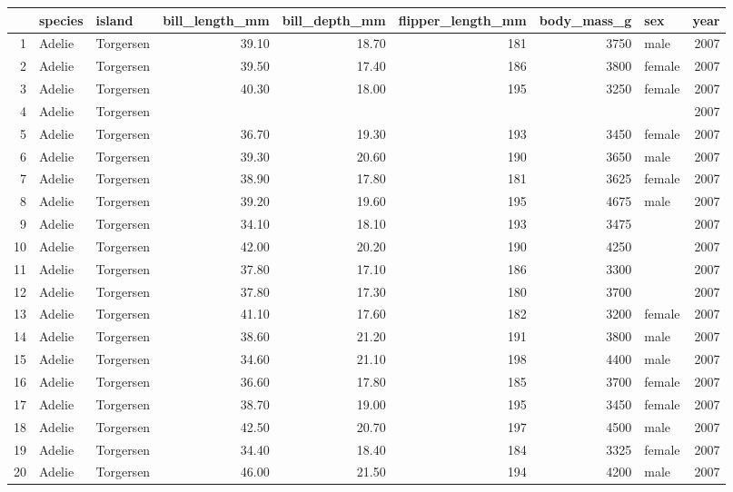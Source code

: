 \documentclass{article}\usepackage[]{graphicx}\usepackage[]{xcolor}
\begin{document}
\begin{table}[ht]
\centering
\begin{tabular}{rllrrrrlr}
  \hline
 & species & island & bill\_length\_mm & bill\_depth\_mm & flipper\_length\_mm & body\_mass\_g & sex & year \\ 
  \hline
1 & Adelie & Torgersen & 39.10 & 18.70 & 181 & 3750 & male & 2007 \\ 
  2 & Adelie & Torgersen & 39.50 & 17.40 & 186 & 3800 & female & 2007 \\ 
  3 & Adelie & Torgersen & 40.30 & 18.00 & 195 & 3250 & female & 2007 \\ 
  4 & Adelie & Torgersen &  &  &  &  &  & 2007 \\ 
  5 & Adelie & Torgersen & 36.70 & 19.30 & 193 & 3450 & female & 2007 \\ 
  6 & Adelie & Torgersen & 39.30 & 20.60 & 190 & 3650 & male & 2007 \\ 
  7 & Adelie & Torgersen & 38.90 & 17.80 & 181 & 3625 & female & 2007 \\ 
  8 & Adelie & Torgersen & 39.20 & 19.60 & 195 & 4675 & male & 2007 \\ 
  9 & Adelie & Torgersen & 34.10 & 18.10 & 193 & 3475 &  & 2007 \\ 
  10 & Adelie & Torgersen & 42.00 & 20.20 & 190 & 4250 &  & 2007 \\ 
  11 & Adelie & Torgersen & 37.80 & 17.10 & 186 & 3300 &  & 2007 \\ 
  12 & Adelie & Torgersen & 37.80 & 17.30 & 180 & 3700 &  & 2007 \\ 
  13 & Adelie & Torgersen & 41.10 & 17.60 & 182 & 3200 & female & 2007 \\ 
  14 & Adelie & Torgersen & 38.60 & 21.20 & 191 & 3800 & male & 2007 \\ 
  15 & Adelie & Torgersen & 34.60 & 21.10 & 198 & 4400 & male & 2007 \\ 
  16 & Adelie & Torgersen & 36.60 & 17.80 & 185 & 3700 & female & 2007 \\ 
  17 & Adelie & Torgersen & 38.70 & 19.00 & 195 & 3450 & female & 2007 \\ 
  18 & Adelie & Torgersen & 42.50 & 20.70 & 197 & 4500 & male & 2007 \\ 
  19 & Adelie & Torgersen & 34.40 & 18.40 & 184 & 3325 & female & 2007 \\ 
  20 & Adelie & Torgersen & 46.00 & 21.50 & 194 & 4200 & male & 2007 \\ 

\end{tabular}
\end{table}
\end{document}
